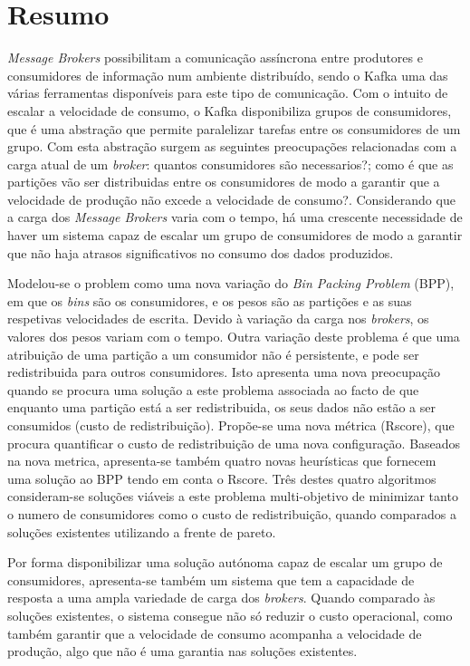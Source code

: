 \chapter*{Resumo}

\textit{Message Brokers} possibilitam a comunicação assíncrona entre produtores
e consumidores de informação num ambiente distribuído, sendo o Kafka uma das
várias ferramentas disponíveis para este tipo de comunicação. Com o intuito de
escalar a velocidade de consumo, o Kafka disponibiliza grupos de consumidores,
que é uma abstração que permite paralelizar tarefas entre os consumidores de um
grupo. Com esta abstração surgem as seguintes preocupações relacionadas com a
carga atual de um \textit{broker}: quantos consumidores são necessarios?; como é
que as partições vão ser distribuidas entre os consumidores de modo a garantir
que a velocidade de produção não excede a velocidade de consumo?. Considerando
que a carga dos \textit{Message Brokers} varia com o tempo, há uma crescente
necessidade de haver um sistema capaz de escalar um grupo de consumidores de
modo a garantir que não haja atrasos significativos no consumo dos dados
produzidos.

Modelou-se o problem como uma nova variação do \textit{Bin Packing Problem} (BPP), em
que os \textit{bins} são os consumidores, e os pesos são as partições e as suas
respetivas velocidades de escrita. Devido à variação da carga nos
\textit{brokers}, os valores dos pesos variam com o tempo. Outra variação deste
problema é que uma atribuição de uma partição a um consumidor não é persistente,
e pode ser redistribuida para outros consumidores. Isto apresenta uma nova
preocupação quando se procura uma solução a este problema associada ao facto de
que enquanto uma partição está a ser redistribuida, os seus dados não estão a
ser consumidos (custo de redistribuição). Propõe-se uma nova métrica (Rscore),
que procura quantificar o custo de redistribuição de uma nova configuração.
Baseados na nova metrica, apresenta-se também quatro novas heurísticas que
fornecem uma solução ao BPP tendo em conta o Rscore. Três destes quatro
algoritmos consideram-se soluções viáveis a este problema multi-objetivo de
minimizar tanto o numero de consumidores como o custo de redistribuição, quando
comparados a soluções existentes utilizando a frente de pareto.

Por forma disponibilizar uma solução autónoma capaz de escalar um grupo de
consumidores, apresenta-se também um sistema que tem a capacidade de resposta a
uma ampla variedade de carga dos \textit{brokers}. Quando comparado às soluções
existentes, o sistema consegue não só reduzir o custo operacional, como também
garantir que a velocidade de consumo acompanha a velocidade de produção, algo
que não é uma garantia nas soluções existentes.
